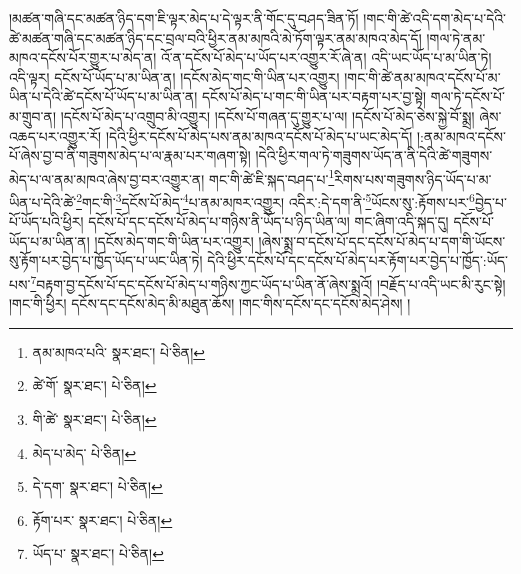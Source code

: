 །མཚན་གཞི་དང་མཚན་ཉིད་དག་ཇི་ལྟར་མེད་པ་དེ་ལྟར་ནི་གོང་དུ་བཤད་ཟིན་ཏོ། །གང་གི་ཚེ་འདི་དག་མེད་པ་དེའི་ཚེ་མཚན་གཞི་དང་མཚན་ཉིད་དང་བྲལ་བའི་ཕྱིར་ནམ་མཁའི་མེ་ཏོག་ལྟར་ནམ་མཁའ་མེད་དོ། །གལ་ཏེ་ནམ་མཁའ་དངོས་པོར་གྱུར་པ་མེད་ན། འོ་ན་དངོས་པོ་མེད་པ་ཡོད་པར་འགྱུར་རོ་ཞེ་ན། འདི་ཡང་ཡོད་པ་མ་ཡིན་ཏེ། འདི་ལྟར། དངོས་པོ་ཡོད་པ་མ་ཡིན་ན། །དངོས་མེད་གང་གི་ཡིན་པར་འགྱུར། །གང་གི་ཚེ་ནམ་མཁའ་དངོས་པོ་མ་ཡིན་པ་དེའི་ཚེ་དངོས་པོ་ཡོད་པ་མ་ཡིན་ན། དངོས་པོ་མེད་པ་གང་གི་ཡིན་པར་བརྟག་པར་བྱ་སྟེ། གལ་ཏེ་དངོས་པོ་མ་གྲུབ་ན། །དངོས་པོ་མེད་པ་འགྲུབ་མི་འགྱུར། །དངོས་པོ་གཞན་དུ་གྱུར་པ་ལ། །དངོས་པོ་མེད་ཅེས་སྐྱེ་བོ་སྨྲ། ཞེས་འཆད་པར་འགྱུར་རོ། །དེའི་ཕྱིར་དངོས་པོ་མེད་པས་ནམ་མཁའ་དངོས་པོ་མེད་པ་ཡང་མེད་དོ། །:ནམ་མཁའ་དངོས་པོ་ཞེས་བྱ་བ་ནི་གཟུགས་མེད་པ་ལ་རྣམ་པར་གཞག་སྟེ། །དེའི་ཕྱིར་གལ་ཏེ་གཟུགས་ཡོད་ན་ནི་དེའི་ཚེ་གཟུགས་མེད་པ་ལ་ནམ་མཁའ་ཞེས་བྱ་བར་འགྱུར་ན། གང་གི་ཚེ་ཇི་སྐད་བཤད་པ་\footnote{ནམ་མཁའ་པའི་  སྣར་ཐང་།  པེ་ཅིན། }རིགས་པས་གཟུགས་ཉིད་ཡོད་པ་མ་ཡིན་པ་དེའི་ཚེ་\footnote{ཚེ་གོ་  སྣར་ཐང་།  པེ་ཅིན། }གང་གི་\footnote{གི་ཚེ་  སྣར་ཐང་།  པེ་ཅིན། }དངོས་པོ་མེད་\footnote{མེད་པ་མེད་  པེ་ཅིན། }པ་ནམ་མཁར་འགྱུར། འདིར་:དེ་དག་ནི་\footnote{དེ་དག་  སྣར་ཐང་།  པེ་ཅིན། }ཡོངས་སུ་:རྟོགས་པར་\footnote{རྟོག་པར་  སྣར་ཐང་།  པེ་ཅིན། }བྱེད་པ་པོ་ཡོད་པའི་ཕྱིར། དངོས་པོ་དང་དངོས་པོ་མེད་པ་གཉིས་ནི་ཡོད་པ་ཉིད་ཡིན་ལ། གང་ཞིག་འདི་སྐད་དུ། དངོས་པོ་ཡོད་པ་མ་ཡིན་ན། །དངོས་མེད་གང་གི་ཡིན་པར་འགྱུར། །ཞེས་སྨྲ་བ་དངོས་པོ་དང་དངོས་པོ་མེད་པ་དག་གི་ཡོངས་སུ་རྟོག་པར་བྱེད་པ་ཁྱོད་ཡོད་པ་ཡང་ཡིན་ཏེ། དེའི་ཕྱིར་དངོས་པོ་དང་དངོས་པོ་མེད་པར་རྟོག་པར་བྱེད་པ་ཁྱོད་:ཡོད་པས་\footnote{ཡོད་པ་  སྣར་ཐང་།  པེ་ཅིན། }བརྟག་བྱ་དངོས་པོ་དང་དངོས་པོ་མེད་པ་གཉིས་ཀྱང་ཡོད་པ་ཡིན་ནོ་ཞེས་སྨྲའོ། །བརྗོད་པ་འདི་ཡང་མི་རུང་སྟེ། །གང་གི་ཕྱིར། དངོས་དང་དངོས་མེད་མི་མཐུན་ཆོས། །གང་གིས་དངོས་དང་དངོས་མེད་ཤེས། །
